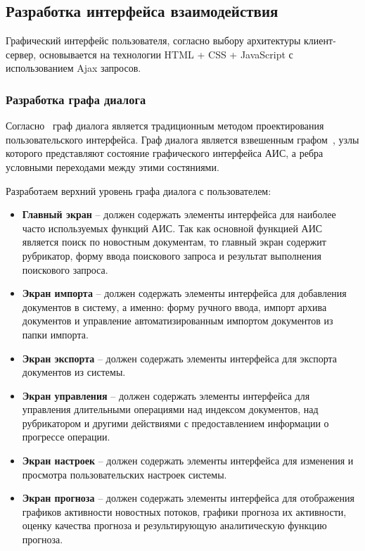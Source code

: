 \subsection{Разработка интерфейса взаимодействия}

Графический интерфейс пользователя, согласно выбору архитектуры клиент-сервер, основывается на технологии HTML + CSS + JavaScript с использованием Ajax запросов. 

\subsubsection{Разработка графа диалога}

Согласно~\cite{ProgrammingTechnologiesSoloviev} граф диалога является традиционным методом проектирования пользовательского интерфейса. Граф диалога является взвешенным графом~\cite{Zukov}, узлы которого представляют состояние графического интерфейса АИС, 
а ребра условными переходами между этими состяниями.

Разработаем верхний уровень графа диалога с пользователем:
\begin{itemize}
\item \textbf{Главный экран} -- должен содержать элементы интерфейса для наиболее часто используемых функций АИС. Так как основной функцией АИС является поиск по новостным документам, то главный экран содержит рубрикатор, форму ввода поискового запроса и результат выполнения поискового запроса.
\item \textbf{Экран импорта} -- должен содержать элементы интерфейса для добавления документов в систему, а именно: форму ручного ввода, импорт архива документов и управление автоматизированным импортом документов из папки импорта.
\item \textbf{Экран экспорта} -- должен содержать элементы интерфейса для экспорта документов из системы.
\item \textbf{Экран управления} -- должен содержать элементы интерфейса для управления длительными операциями над индексом документов, над рубрикатором и другими действиями с предоставлением информации о прогрессе операции.
\item \textbf{Экран настроек} -- должен содержать элементы интерфейса для изменения и просмотра пользовательских настроек системы.
\item \textbf{Экран прогноза} -- должен содержать элементы интерфейса для отображения графиков активности новостных потоков, графики прогноза их активности, оценку качества прогноза и результирующую аналитическую функцию прогноза.
\end{itemize}

